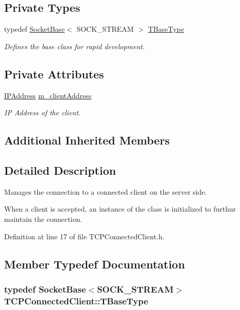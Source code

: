 \subsection*{Private Types}
\begin{DoxyCompactItemize}
\item 
typedef \hyperlink{class_socket_base}{Socket\-Base}$<$ S\-O\-C\-K\-\_\-\-S\-T\-R\-E\-A\-M $>$ \hyperlink{class_t_c_p_connected_client_a8f789adb85d13f662bc739ac7979e270}{T\-Base\-Type}
\begin{DoxyCompactList}\small\item\em Defines the base class for rapid development. \end{DoxyCompactList}\end{DoxyCompactItemize}
\subsection*{Private Attributes}
\begin{DoxyCompactItemize}
\item 
\hyperlink{class_i_p_address}{I\-P\-Address} \hyperlink{class_t_c_p_connected_client_a7ef3342e4792893fa7c653a5f1a02ffe}{m\-\_\-client\-Address}
\begin{DoxyCompactList}\small\item\em I\-P Address of the client. \end{DoxyCompactList}\end{DoxyCompactItemize}
\subsection*{Additional Inherited Members}


\subsection{Detailed Description}
Manages the connection to a connected client on the server side. 

When a client is accepted, an instance of the class is initialized to furthur maintain the connection. 

Definition at line 17 of file T\-C\-P\-Connected\-Client.\-h.



\subsection{Member Typedef Documentation}
\hypertarget{class_t_c_p_connected_client_a8f789adb85d13f662bc739ac7979e270}{
\subsubsection[{T\-Base\-Type}]{\setlength{\rightskip}{0pt plus 5cm}typedef {\bf Socket\-Base}$<$S\-O\-C\-K\-\_\-\-S\-T\-R\-E\-A\-M$>$ {\bf T\-C\-P\-Connected\-Client\-::\-T\-Base\-Type}\hspace{0.3cm}{\ttfamily [private]}}}\label{class_t_c_p_connected_client_a8f789adb85d13f662bc739ac7979e270}


